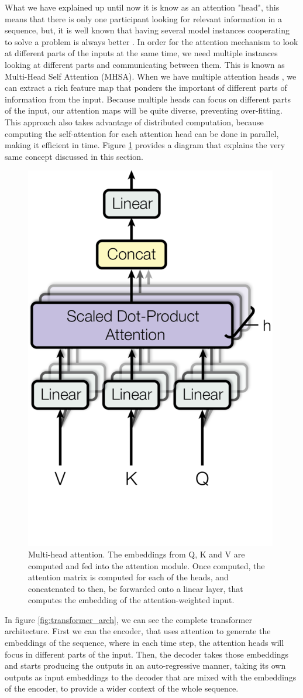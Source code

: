 What we have explained up until now it is know as an attention "head", this means that there is only one participant looking for relevant information in a sequence, but, it is well known that having several model instances cooperating to solve a problem is always better \cite{model_emsembling_survey}. In order for the attention mechanism to look at different parts of the inputs at the same time, we need multiple instances looking at different parts and communicating between them. This is known as Multi-Head Self Attention (MHSA). When we have multiple attention heads \cite{vaswani2023attention}, we can extract a rich feature map that ponders the important of different parts of information from the input. Because multiple heads can focus on different parts of the input, our attention maps will be quite diverse, preventing over-fitting. This approach also takes advantage of distributed computation, because computing the self-attention for each attention head can be done in parallel, making it efficient in time. Figure \ref{fig:multihead_attn} provides a diagram that explains the very same concept discussed in this section.

\begin{figure}[!h]
	\centering
	\includegraphics[width=0.25\linewidth]{figures/multi_head_attn.png}
	\caption{Multi-head attention. The embeddings from Q, K and V are computed and fed into the attention module. Once computed, the attention matrix is computed for each of the heads, and concatenated to then, be forwarded onto a linear layer, that computes the embedding of the attention-weighted input.}
	\label{fig:multihead_attn}
\end{figure} 

In figure \ref{fig:transformer_arch}, we can see the complete transformer architecture. First we can the encoder, that uses attention to generate the embeddings of the sequence, where in each time step, the attention heads will focus in different parts of the input. Then, the decoder takes those embeddings and starts producing the outputs in an auto-regressive manner, taking its own outputs as input embeddings to the decoder that are mixed with the embeddings of the encoder, to provide a wider context of the whole sequence.

